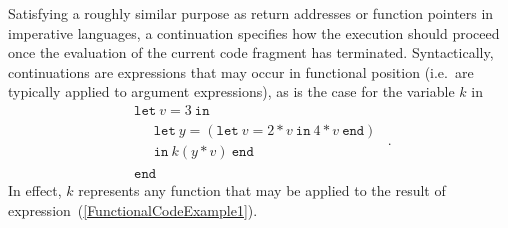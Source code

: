 Satisfying a roughly similar purpose as return addresses or function
pointers in imperative languages, a continuation specifies how the
execution should proceed once the evaluation of the current code
fragment has terminated. Syntactically, continuations are expressions
that may occur in functional position (i.e.~are typically applied to
argument expressions), as is the case for the variable $k$ in
\begin{equation}
\label{ContinuationCode0}
\begin{array}{l}
  \mathtt{let}\ v = 3\ \mathtt{in}\\
  \quad \begin{array}{l} 
    \mathtt{let}\ y = (\mathtt{let}\ v=2*v \ \mathtt{in}\ 4*v\ \mathtt{end})\\
    \mathtt{in}\ k (y*v)\ \mathtt{end}
  \end{array}\\
  \mathtt{end}
  \end{array}.
\end{equation}
In effect, $k$ represents any function that may be applied to the
result of expression~(\ref{FunctionalCodeExample1}).

